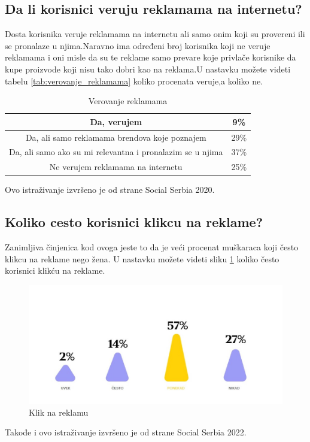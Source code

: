 \documentclass[a4paper]{article}
\begin{document}
	\subsection{Da li korisnici veruju reklamama na internetu?}
	\label{subsec:veovanje_reklamama}
	Dosta korisnika veruje reklamama na internetu ali samo onim koji su provereni ili se pronalaze u njima.Naravno ima određeni broj korisnika koji ne veruje reklamama i oni misle da su te reklame samo prevare koje privlače korisnike da kupe proizvode koji nisu tako dobri kao na reklama.U nastavku možete videti tabelu \ref{tab:verovanje_reklamama} koliko procenata veruje,a koliko ne.
	
	\renewcommand{\tablename}{Tabela}
	\begin{table}[h!]
		\begin{center}
			\caption{Verovanje reklamama}
			\begin{tabular}{|c|c|} \hline
				Da, verujem&9\%\\ \hline
				Da, ali samo reklamama brendova koje poznajem&29\%\\ \hline
				Da, ali samo ako su mi relevantna i pronalazim se u njima&37\%\\ \hline
				Ne verujem reklamama na internetu&25\%\\ \hline
			\end{tabular}
			\label{tab:tabela1}
		\end{center}
	\end{table}
	
	
	Ovo istraživanje izvršeno je od strane Social Serbia 2020.
	\subsection{Koliko cesto korisnici klikcu na reklame?}
	\label{subsec:klik_na_reklamu}
	Zanimljiva činjenica kod ovoga jeste to da je veći procenat muškaraca koji često klikcu na reklame nego žena. U nastavku možete videti sliku \ref{fig:klik_na_reklamu} koliko često korisnici klikću na reklame.
	
	
	\begin{figure}[h!]
		\begin{center}
			\includegraphics[scale=0.55]{klik_na_reklamu.jpg}
		\end{center}
		\caption{Klik na reklamu}
		\label{fig:klik_na_reklamu}
	\end{figure}
	Takođe i ovo istraživanje izvršeno je od strane Social Serbia 2022.
\end{document}
